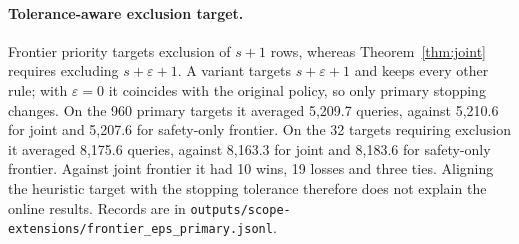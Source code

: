 \paragraph{Tolerance-aware exclusion target.} Frontier priority targets exclusion of $s+1$ rows, whereas Theorem~\ref{thm:joint} requires excluding $s+\varepsilon+1$. A variant targets $s+\varepsilon+1$ and keeps every other rule; with $\varepsilon=0$ it coincides with the original policy, so only primary stopping changes. On the 960 primary targets it averaged 5,209.7 queries, against 5,210.6 for joint and 5,207.6 for safety-only frontier. On the 32 targets requiring exclusion it averaged 8,175.6 queries, against 8,163.3 for joint and 8,183.6 for safety-only frontier. Against joint frontier it had 10 wins, 19 losses and three ties. Aligning the heuristic target with the stopping tolerance therefore does not explain the online results. Records are in \nolinkurl{outputs/scope-extensions/frontier_eps_primary.jsonl}.
